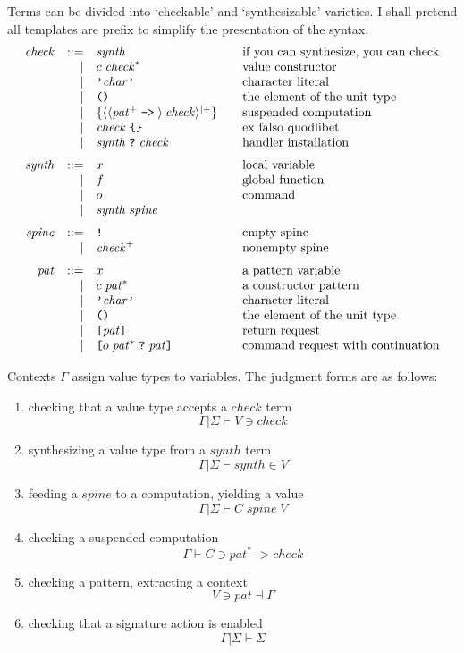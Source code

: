 \documentclass{article}
\begin{document}
Terms can be divided into `checkable' and `synthesizable' varieties.
I shall pretend all templates are prefix to simplify the presentation of
the syntax.
\[\begin{array}{rrl@{\qquad}l}
\mathit{check} & ::= & \mathit{synth} & \mbox{if you can synthesize, you can check}\\
 &|& c\;\mathit{check}^* & \mbox{value constructor} \\
 &|& \texttt{'}\mathit{char}\texttt{'} & \mbox{character literal} \\
 &|& \texttt{()} & \mbox{the element of the unit type} \\
 &|& \{\langle\langle\mathit{pat}^+\;\texttt{->}\;\rangle\:\mathit{check}\rangle^{|+}\} & \mbox{suspended computation} \\
&|& \mathit{check}\;\texttt{\{\}} & \mbox{ex falso quodlibet} \\
&|& \mathit{synth}\;\texttt{?}\;\mathit{check}
  & \mbox{handler installation}
\medskip \\
\mathit{synth} & ::= & x & \mbox{local variable} \\
 &|& f & \mbox{global function} \\
 &|& o & \mbox{command} \\
 &|& \mathit{synth}\;\mathit{spine}
 \medskip \\
\mathit{spine} & ::= & \texttt{!} & \mbox{empty spine} \\
&|& \mathit{check}^+ & \mbox{nonempty spine}
\medskip \\
\mathit{pat} & ::= & x & \mbox{a pattern variable} \\
&|& c\;\mathit{pat}^* & \mbox{a constructor pattern} \\
&|& \texttt{'}\mathit{char}\texttt{'} & \mbox{character literal} \\
&|& \texttt{()} & \mbox{the element of the unit type} \\
&|& \texttt{[}\mathit{pat}\texttt{]} & \mbox{return request} \\
&|& \texttt{[}o\;\mathit{pat}^\ast\;\texttt{?}\;\mathit{pat}\texttt{]}
 & \mbox{command request with continuation}
\end{array}\]

Contexts \(\Gamma\) assign value types to variables.
The judgment forms are as follows:
\begin{enumerate}
\item checking that a value type accepts a \(\mathit{check}\) term
\[
\Gamma|\Sigma \vdash V \ni \mathit{check}
\]
\item synthesizing a value type from a \(\mathit{synth}\) term
\[
\Gamma|\Sigma \vdash \mathit{synth} \in V
\]
\item feeding a \(\mathit{spine}\) to a computation, yielding a value
\[
\Gamma|\Sigma \vdash C \;\mathit{spine}\; V
\]
\item checking a suspended computation
\[
\Gamma \vdash C \ni \mathit{pat}^\ast \;\texttt{->}\;\mathit{check}
\]
\item checking a pattern, extracting a context
\[
V\ni\mathit{pat}\dashv \Gamma
\]
\item checking that a signature action is enabled
\[
\Gamma|\Sigma \vdash \Sigma
\]
\end{enumerate}
\end{document}
